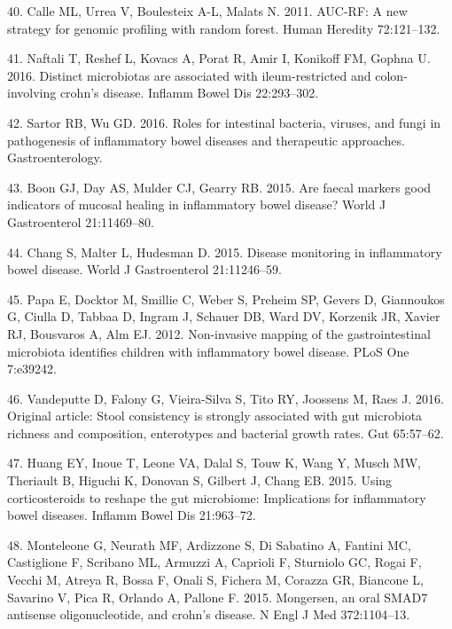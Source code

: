\documentclass[11pt,]{article}
\begin{document}
\hypertarget{ref-calle_aucrf_2011}{}
40. Calle ML, Urrea V, Boulesteix A-L, Malats N. 2011. AUC-RF: A new
strategy for genomic profiling with random forest. Human Heredity
72:121--132.

\hypertarget{ref-naftali_tissinvol_2016}{}
41. Naftali T, Reshef L, Kovacs A, Porat R, Amir I, Konikoff FM, Gophna
U. 2016. Distinct microbiotas are associated with ileum-restricted and
colon-involving crohn's disease. Inflamm Bowel Dis 22:293--302.

\hypertarget{ref-sartor_microbesIBD_2016}{}
42. Sartor RB, Wu GD. 2016. Roles for intestinal bacteria, viruses, and
fungi in pathogenesis of inflammatory bowel diseases and therapeutic
approaches. Gastroenterology.

\hypertarget{ref-boon_fmarkers_2015}{}
43. Boon GJ, Day AS, Mulder CJ, Gearry RB. 2015. Are faecal markers good
indicators of mucosal healing in inflammatory bowel disease? World J
Gastroenterol 21:11469--80.

\hypertarget{ref-chang_monitoring_2015}{}
44. Chang S, Malter L, Hudesman D. 2015. Disease monitoring in
inflammatory bowel disease. World J Gastroenterol 21:11246--59.

\hypertarget{ref-papa_pedsIBD_2012}{}
45. Papa E, Docktor M, Smillie C, Weber S, Preheim SP, Gevers D,
Giannoukos G, Ciulla D, Tabbaa D, Ingram J, Schauer DB, Ward DV,
Korzenik JR, Xavier RJ, Bousvaros A, Alm EJ. 2012. Non-invasive mapping
of the gastrointestinal microbiota identifies children with inflammatory
bowel disease. PLoS One 7:e39242.

\hypertarget{ref-vandeputte_stoolcon_2016}{}
46. Vandeputte D, Falony G, Vieira-Silva S, Tito RY, Joossens M, Raes J.
2016. Original article: Stool consistency is strongly associated with
gut microbiota richness and composition, enterotypes and bacterial
growth rates. Gut 65:57--62.

\hypertarget{ref-huang_cort_2015}{}
47. Huang EY, Inoue T, Leone VA, Dalal S, Touw K, Wang Y, Musch MW,
Theriault B, Higuchi K, Donovan S, Gilbert J, Chang EB. 2015. Using
corticosteroids to reshape the gut microbiome: Implications for
inflammatory bowel diseases. Inflamm Bowel Dis 21:963--72.

\hypertarget{ref-monteleone_mongersen_2015}{}
48. Monteleone G, Neurath MF, Ardizzone S, Di Sabatino A, Fantini MC,
Castiglione F, Scribano ML, Armuzzi A, Caprioli F, Sturniolo GC, Rogai
F, Vecchi M, Atreya R, Bossa F, Onali S, Fichera M, Corazza GR, Biancone
L, Savarino V, Pica R, Orlando A, Pallone F. 2015. Mongersen, an oral
SMAD7 antisense oligonucleotide, and crohn's disease. N Engl J Med
372:1104--13.
\end{document}

